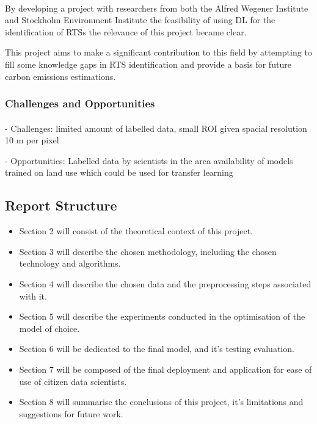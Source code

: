 \documentclass{article}
\begin{document}
\paragraph{}
By developing a project with researchers from both the Alfred Wegener Institute and Stockholm Environment Institute the feasibility of using DL for the identification of RTSs the relevance of this project became clear.

This project aims to make a significant contribution to this field by attempting to fill some knowledge gaps in RTS identification and provide a basis for future carbon emissions estimations.

\subsubsection{Challenges and Opportunities}
\paragraph{}
- Challenges: limited amount of labelled data, small ROI given spacial resolution 10 m per pixel

- Opportunities: Labelled data by scientists in the area availability of models trained on land use which could be used for transfer learning


\subsection{Report Structure}
\begin{itemize}
    \item Section 2 will consist of the theoretical context of this project. \item Section 3 will describe the chosen methodology, including the chosen technology and algorithms. 
    \item Section 4 will describe the chosen data and the preprocessing steps associated with it. 
    \item Section 5 will describe the experiments conducted in the optimisation of the model of choice.
    \item Section 6 will be dedicated to the final model, and it's testing evaluation.
    \item Section 7 will be composed of the final deployment and application for ease of use of citizen data scientists.
    \item Section 8 will summarise the conclusions of this project, it's limitations and suggestions for future work.

\end{itemize}
\end{document}

